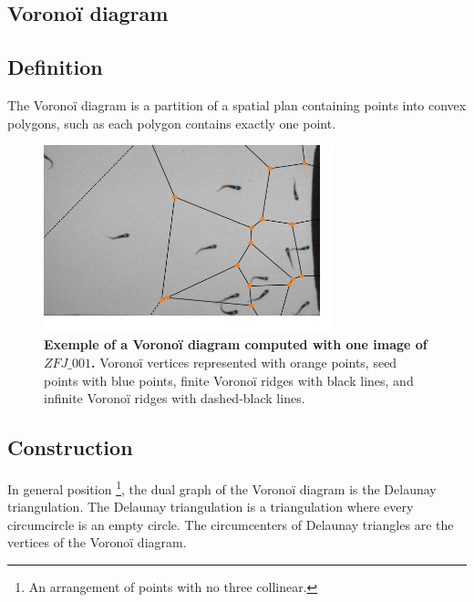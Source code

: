     \begin{appendices}
    \chapter{Voronoï diagram}
        \label{appendix_voronoi}
        \section{Definition}
        The Voronoï diagram is a partition of a spatial plan containing points into convex polygons, such as each polygon contains exactly one point.

        \begin{figure}[h!]
        \centering
        \includegraphics[width=0.75\textwidth]{part_1/assets/Appendix_voronoi.png}
        \caption{{\bf Exemple of a Voronoï diagram computed with one image of $ZFJ\_001$.} Voronoï vertices represented with orange points, seed points with blue points, finite Voronoï ridges with black lines, and infinite Voronoï ridges with dashed-black lines.}
        \end{figure}

        \section{Construction}
        In general position \footnote{An arrangement of points with no three collinear.}, the dual graph of the Voronoï diagram is the Delaunay triangulation. The Delaunay triangulation is a triangulation where every circumcircle is an empty circle. The circumcenters of Delaunay triangles are the vertices of the Voronoï diagram.


\end{appendices}
